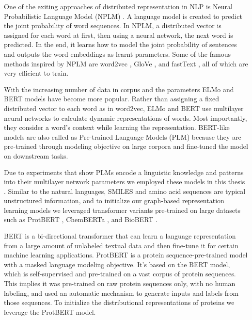 One of the exiting approaches of distributed representation in NLP is Neural Probabilistic Language Model (NPLM) \cite{bengio2001neural}. A language model is created to predict the joint probability of word sequences. In NPLM, a distributed vector is assigned for each word at first, then using a neural network, the next word is predicted. In the end, it learns how to model the joint probability of sentences and outputs the word embeddings as learnt parameters. Some of the famous methods inspired by NPLM are word2vec \cite{mikolov2013distributed}, GloVe \cite{bojanowski2017enriching}, and fastText \cite{pennington2014glove}, all of which are very efficient to train. 

With the increasing number of data in corpus and the parameters ELMo \cite{devlin2018bert} and BERT \cite{peters2018deep} models have become more popular. Rather than assigning a fixed distributed vector to each word as in word2vec, ELMo and BERT use multilayer neural networks to calculate dynamic representations of words. Most importantly, they consider a word's context while learning the representation. BERT-like models are also called as Pre-trained Language Models (PLM) because they are pre-trained through modeling objective on large corpora and fine-tuned the model on downstream tasks. 

Due to experiments that show PLMs encode a linguistic knowledge and patterns into their multilayer network parameters we employed these models in this thesis \cite{liu2019linguistic, hewitt2019structural}. Similar to the natural languages, SMILES and amino acid sequences are typical unstructured information, and to initialize our graph-based representation learning models we leveraged transformer variants pre-trained on large datasets such as ProtBERT \cite{Elnaggar2020.07.12.199554}, ChemBERTa \cite{chithrananda2020chemberta}, and BioBERT \cite{lee2020biobert}. 

BERT is a bi-directional transformer that can learn a language representation from a large amount of unlabeled textual data and then fine-tune it for certain machine learning applications. ProtBERT \cite{prot_bert, Elnaggar2020.07.12.199554} is a protein sequence-pre-trained model with a masked language modeling objective. It's based on the BERT model, which is self-supervised and pre-trained on a vast corpus of protein sequences. This implies it was pre-trained on raw protein sequences only, with no human labeling, and used an automatic mechanism to generate inputs and labels from those sequences. To initialize the distributional representations of proteins we leverage the ProtBERT model. 


